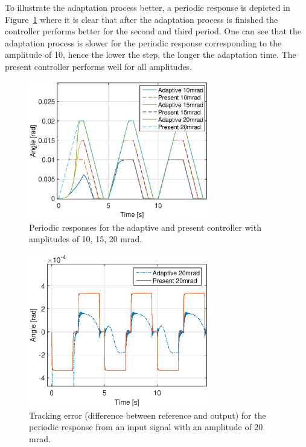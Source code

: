 \FloatBarrier
To illustrate the adaptation process better, a periodic response is depicted in Figure~\ref{fig:periodic_resp} where it is clear that after the adaptation process is finished the controller performs better for the second and third period. One can see that the adaptation process is slower for the periodic response corresponding to the amplitude of \unit{10}{\milli\radian}, hence the lower the step, the longer the adaptation time. The present controller performs well for all amplitudes.

\begin{figure}[h!]
  \centering
  \includegraphics[width=0.7\textwidth]{fig/matlab/periodicresponse.eps}
  \caption{\label{fig:periodic_resp} Periodic responses for the adaptive and present controller with amplitudes of 10, 15, 20 mrad.}
\end{figure}

\begin{figure}[h!]
  \centering
  \includegraphics[width=0.7\textwidth]{fig/matlab/trackingerror.eps}
  \caption{\label{fig:adapt_trackingerror} Tracking error (difference between reference and output) for the periodic response from an input signal with an amplitude of 20 mrad.}
\end{figure}

